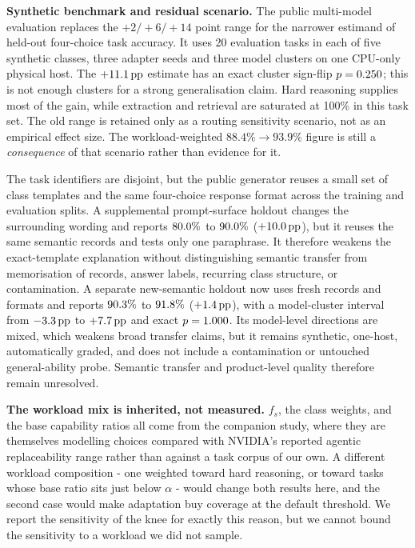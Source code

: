\documentclass[conference]{IEEEtran}
\newcommand{\fs}{f_{s}}
\newcommand{\pp}{\,\text{pp}}
\begin{document}
\textbf{Synthetic benchmark and residual scenario.} The public multi-model
evaluation replaces the $+2/+6/+14$ point range for the narrower estimand of
held-out four-choice task accuracy. It uses 20 evaluation tasks in each of
five synthetic classes, three adapter seeds and three model clusters on one
CPU-only physical host. The $+\AdaptationUplift\pp$ estimate has an exact
cluster sign-flip $p=0.250$; this is not enough clusters for a
strong generalisation claim. Hard reasoning supplies most of the gain, while
extraction and retrieval are saturated at 100\% in this task set. The old
range is retained only as a routing sensitivity scenario, not as an empirical
effect size. The workload-weighted $88.4\% \rightarrow 93.9\%$ figure is still
a \emph{consequence} of that scenario rather than evidence for it.

The task identifiers are disjoint, but the public generator reuses a small
set of class templates and the same four-choice response format across the
training and evaluation splits. A supplemental prompt-surface holdout changes
the surrounding wording and reports $80.0\%$ to
$90.0\%$ ($+\AdaptationHoldoutUplift\pp$), but it
reuses the same semantic records and tests only one paraphrase. It therefore
weakens the exact-template explanation without distinguishing semantic transfer
from memorisation of records, answer labels, recurring class structure, or
contamination. A separate new-semantic holdout now uses fresh records and
formats and reports $90.3\%$ to
$91.8\%$ ($+\AdaptationSemanticUplift\pp$),
with a model-cluster interval from $\AdaptationSemanticUpliftLow\pp$ to
$+\AdaptationSemanticUpliftHigh\pp$ and exact $p=1.000$.
Its model-level directions are mixed, which weakens broad transfer claims, but
it remains synthetic, one-host, automatically graded, and does not include a
contamination or untouched general-ability probe. Semantic transfer and
product-level quality therefore remain unresolved.

\textbf{The workload mix is inherited, not measured.} $\fs$, the class weights,
and the base capability ratios all come from the companion study, where they are
themselves modelling choices compared with NVIDIA's reported agentic
replaceability range rather than against a task corpus of our own. A different
workload composition - one weighted toward hard reasoning, or toward tasks whose
base ratio sits just below $\alpha$ - would change both results here, and the
second case would make adaptation buy coverage at the default threshold. We
report the sensitivity of the knee for exactly this reason, but we cannot bound
the sensitivity to a workload we did not sample.
\end{document}
